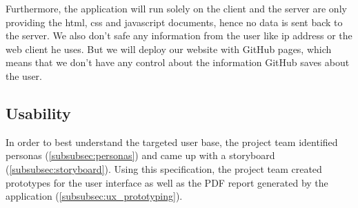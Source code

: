 Furthermore, the application will run solely on the client and the server are only providing the html,
css and javascript documents, hence no data is sent back to the server.
We also don't safe any information from the user like ip address or the web client he uses.
But we will deploy our website with GitHub pages, which means that we don't have any control about the information GitHub saves about the user.

\subsection{Usability}\label{subsec:usability}
In order to best understand the targeted user base, the project team identified personas (\ref{subsubsec:personas}) and came up with a storyboard (\ref{subsubsec:storyboard}).
Using this specification, the project team created prototypes for the user interface as well as the PDF report generated by the application (\ref{subsubsec:ux_prototyping}).

